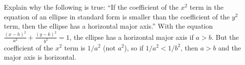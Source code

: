 {Explain why the following is true: ``If the coefficient of the $x^2$ term in the equation of an ellipse in standard form is smaller than the coefficient of the $y^2$ term, then the ellipse has a horizontal major axis.''
}
{With the equation $\frac{(x-h)^2}{a^2}+\frac{(y-k)^2}{b^2}=1$, the ellipse has a horizontal major axis if $a>b$. But the coefficient of the $x^2$ term is $1/a^2$ (not $a^2$), so if $1/a^2<1/b^2$, then $a>b$ and the major axis is horizontal.
}
